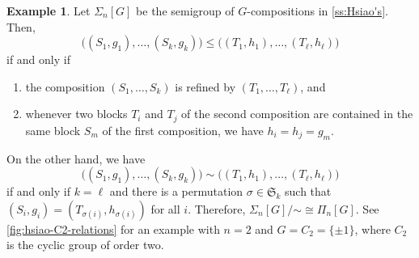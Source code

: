 \documentclass[11pt, oneside, reqno]{amsart}
\theoremstyle{definition}
\newtheorem{example}[theorem]{Example}
\numberwithin{equation}{section}
\def \ztwo {{C_2}}
\def \gsetcomposition{{\Sigma_n[G]}}
\def \gsetpartition{{\Pi_n[G]}}
\def \hsiao {{\gsetcomposition}}
\begin{document}
\begin{example}\label{ex:hsiao-order}
    Let $\hsiao$ be the semigroup of $G$-compositions in \cref{ss:Hsiao's}.
    Then,
    \[
        \big( (S_1,g_1),\dots,(S_k,g_k) \big) \leq \big( (T_1,h_1),\dots,(T_\ell,h_\ell) \big)
    \]
    if and only if 
    \begin{enumerate}
        \item the composition $(S_1,\dots,S_k)$ is refined by $(T_1,\dots,T_\ell)$, and
        \item whenever two blocks $T_i$ and $T_j$ of the second composition are contained in the same block $S_m$ of the first composition, we have $h_i = h_j = g_m$.
    \end{enumerate}

    On the other hand, we have
    \[
        \big( (S_1,g_1),\dots,(S_k,g_k) \big) \sim \big( (T_1,h_1),\dots,(T_\ell,h_\ell) \big)
    \]
    if and only if $k = \ell$ and there is a permutation $\sigma \in \mathfrak{S}_k$ such that $(S_i , g_i) = (T_{\sigma(i)} , h_{\sigma(i)})$ for all $i$.
    Therefore, $\hsiao/\mathord{\sim} \cong \gsetpartition$.
    See \cref{fig:hsiao-C2-relations} for an example with $n=2$ and $G = \ztwo = \{\pm 1\}$, where $\ztwo$ is the cyclic group of order two.

    \begin{figure}[ht]
        \centering
\end{figure}
\end{example}
\end{document}
